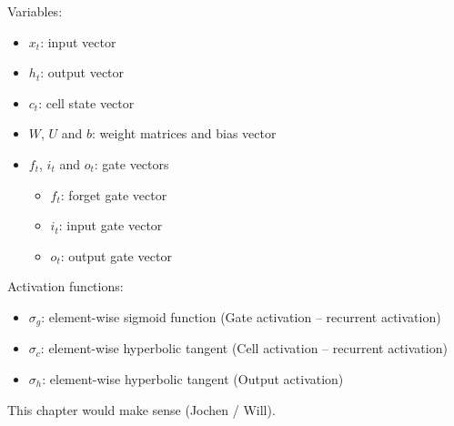 Variables:
\begin{itemize}
\item $x_t$: input vector
\item $h_t$: output vector
\item $c_t$: cell state vector
\item $W$, $U$ and $b$: weight matrices and bias vector
\item $f_t$, $i_t$ and $o_t$: gate vectors
  \begin{itemize}
  \item $f_t$: forget gate vector
  \item $i_t$: input gate vector
  \item $o_t$: output gate vector
  \end{itemize}
\end{itemize}

Activation functions:
\begin{itemize}
\item $\sigma_g$: element-wise sigmoid function (Gate activation -- recurrent
  activation)
\item $\sigma_c$: element-wise hyperbolic tangent (Cell activation -- recurrent
  activation)
\item $\sigma_h$: element-wise hyperbolic tangent (Output activation)
\end{itemize}

This chapter would make sense (Jochen / Will).

